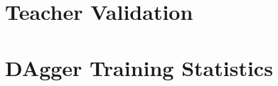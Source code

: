 \documentclass[conference]{IEEEtran}
\newcommand{\placeholder}[1]{\textcolor{blue}{[#1]}}
\begin{document}
\section{Teacher Validation}\label{app:teacher}
\begin{table}[h]
\centering
\caption{\placeholder{Teacher validation with true caution, 50 episodes per condition}}
\label{tab:teacher}
\end{table}
\section{DAgger Training Statistics}\label{app:dagger}
\begin{table}[h]
\centering
\caption{\placeholder{DAgger rounds: episodes, cumulative samples, final loss}}
\label{tab:dagger}
\end{table}



\end{document}

